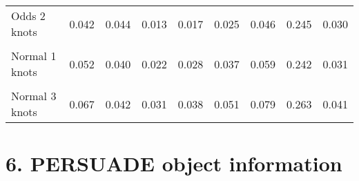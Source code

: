 \documentclass[
]{article}
\begin{document}
\begin{table}[H]
{\begin{tabular}[t]{lrrrrrrrr}
Odds 2 knots & 0.042 & 0.044 & 0.013 & 0.017 & 0.025 & 0.046 & 0.245 & 0.030\\
\cellcolor{gray!10}{Odds 3 knots} & \cellcolor{gray!10}{0.048} & \cellcolor{gray!10}{0.046} & \cellcolor{gray!10}{0.015} & \cellcolor{gray!10}{0.020} & \cellcolor{gray!10}{0.029} & \cellcolor{gray!10}{0.055} & \cellcolor{gray!10}{0.262} & \cellcolor{gray!10}{0.035}\\
Normal 1 knots & 0.052 & 0.040 & 0.022 & 0.028 & 0.037 & 0.059 & 0.242 & 0.031\\
\cellcolor{gray!10}{Normal 2 knots} & \cellcolor{gray!10}{0.053} & \cellcolor{gray!10}{0.040} & \cellcolor{gray!10}{0.023} & \cellcolor{gray!10}{0.028} & \cellcolor{gray!10}{0.038} & \cellcolor{gray!10}{0.060} & \cellcolor{gray!10}{0.241} & \cellcolor{gray!10}{0.032}\\
Normal 3 knots & 0.067 & 0.042 & 0.031 & 0.038 & 0.051 & 0.079 & 0.263 & 0.041\\
\bottomrule
\end{tabular}}
\end{table}

\clearpage

\section{6. PERSUADE object
information}\label{persuade-object-information}
\end{document}
